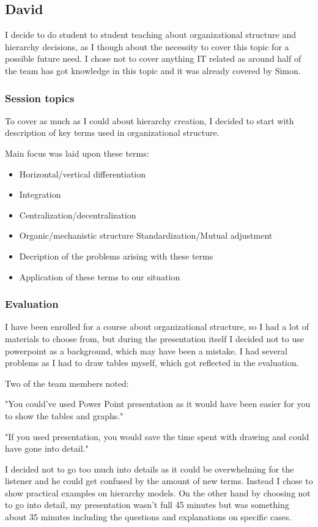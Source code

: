 \subsection{David}
I decide to do student to student teaching about organizational structure and hierarchy decisions, as I though about the necessity to cover this topic for a possible future need. I chose not to cover anything IT related as around half of the team has got knowledge in this topic and it was already covered by Simon.

\subsubsection{Session topics}
To cover as much as I could about hierarchy creation, I decided to start with description of key terms used in organizational structure.

Main focus was laid upon these terms:
\begin{itemize}
\item Horizontal/vertical differentiation
\item Integration
\item Centralization/decentralization
\item Organic/mechanistic structure
\iten Standardization/Mutual adjustment
\item Decription of the problems arising with these terms
\item Application of these terms to our situation
\end{itemize}

\subsubsection{Evaluation}
I have been enrolled for a course about organizational structure, so I had a lot of materials to choose from, but during the presentation itself I decided not to use powerpoint as a background, which may have been a mistake. I had several problems as I had to draw tables myself, which got reflected in the evaluation.

Two of the team members noted:

"You could've used Power Point presentation as it would have been easier for you to show the tables and graphs."

"If you used presentation, you would save the time spent with drawing and could have gone into detail."

I decided not to go too much into details as it could be overwhelming for the listener and he could get confused by the amount of new terms. Instead I chose to show practical examples on hierarchy models. On the other hand by choosing not to go into detail, my presentation wasn't full 45 minutes but was something about 35 minutes including the questions and explanations on specific cases.


